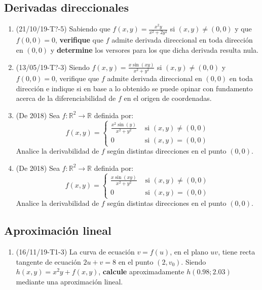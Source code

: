 \documentclass[12pt,a4paper]{article}
\renewcommand{\b}[1]{\textbf{#1}}
\newcommand{\R}{\mathbb{R}}
\begin{document}
\subsection{Derivadas direccionales}
\begin{enumerate}
	\item (21/10/19-T?-5) Sabiendo que $ f ( x, y ) = \frac{x^2y}{x^2+2y^2} $ si $ ( x, y )\neq ( 0, 0 ) $ y que $ f ( 0, 0 ) = 0 $, \b{verifique} que $ f $ admite derivada direccional en toda dirección en $ ( 0, 0 ) $ y \b{determine} los versores para los que dicha derivada resulta nula.
	
	\item (13/05/19-T?-3) Siendo $ f ( x, y ) =	\frac{x \sin( x y )}{x^2 + y^2} $ si $ ( x, y ) \neq ( 0, 0 ) $ y $ f ( 0, 0 ) = 0 $, verifique que $ f $ admite derivada direccional en $ ( 0, 0 ) $ en toda dirección e indique si en base a lo obtenido se puede opinar con fundamento	acerca de la diferenciabilidad de $ f $ en el origen de coordenadas.
	
	\item (De 2018) Sea $ f : \R^2\rightarrow\R $ definida por:
	\[f(x, y) = \begin{cases}
		\frac{x^2\sin(y)}{x^2 + y^2} & \text{ si }(x, y)\neq(0, 0)\\
		0 & \text{ si }(x, y)=(0, 0)
	\end{cases}
	\]
	Analice la derivabilidad de $ f $ según distintas direcciones en el punto $(0, 0)$.
	
	\item (De 2018) Sea $ f : \R^2\rightarrow\R $ definida por:
	\[f(x, y) = \begin{cases}
	\frac{x\sin(xy)}{x^2 + y^2} & \text{ si }(x, y)\neq(0, 0)\\
	0 & \text{ si }(x, y)=(0, 0)
	\end{cases}
	\]
	Analice la derivabilidad de $ f $ según distintas direcciones en el punto $(0, 0)$.
\end{enumerate}

\subsection{Aproximación lineal}
\begin{enumerate}
	\item (16/11/19-T1-3) La curva de ecuación $ v = f (u ) $, en el plano $ uv $, tiene recta tangente de ecuación $ 2 u + v = 8 $ en el punto $ ( 2, v_0 ) $. Siendo $ h ( x, y ) = x^2 y + f (x, y) $, \b{calcule}  aproximadamente $ h ( 0.98; 2.03 ) $ mediante una aproximación lineal.
\end{enumerate}
\end{document}
